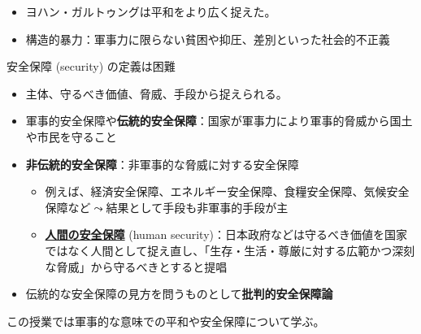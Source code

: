 \documentclass[
  xelatex,
  ja=standard]{bxjsarticle}
\providecommand{\tightlist}{%
  \setlength{\itemsep}{0pt}\setlength{\parskip}{0pt}}\usepackage{longtable,booktabs,array}
\begin{document}
\begin{itemize}
\tightlist
\item
  ヨハン・ガルトゥングは平和をより広く捉えた。
\item
  構造的暴力：軍事力に限らない貧困や抑圧、差別といった社会的不正義
\end{itemize}

安全保障 (security) の定義は困難

\begin{itemize}
\tightlist
\item
  主体、守るべき価値、脅威、手段から捉えられる\citep[第1章]{boudai2018}。
\item
  軍事的安全保障や\textbf{伝統的安全保障}：国家が軍事力により軍事的脅威から国土や市民を守ること
\item
  \textbf{非伝統的安全保障}：非軍事的な脅威に対する安全保障

  \begin{itemize}
  \tightlist
  \item
    例えば、経済安全保障、エネルギー安全保障、食糧安全保障、気候安全保障など\(\leadsto\)結果として手段も非軍事的手段が主
  \item
    \href{https://www.mofa.go.jp/mofaj/gaiko/oda/bunya/security/index.html}{\textbf{人間の安全保障}}
    (human
    security)：日本政府などは守るべき価値を国家ではなく人間として捉え直し、「生存・生活・尊厳に対する広範かつ深刻な脅威」から守るべきとすると提唱\citep{hs2003, sen2006, osa2021}
  \end{itemize}
\item
  伝統的な安全保障の見方を問うものとして\textbf{批判的安全保障論}\citep{minamiyama2022}
\end{itemize}

この授業では軍事的な意味での平和や安全保障について学ぶ。


  
\end{document}
